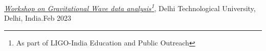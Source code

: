\begin{itemize}[noitemsep]
{
\item \href{https://github.com/singhmukesh1729/EPO_DTU2023}{\textit{Workshop on Gravitational Wave data analysis\footnote{As part of LIGO-India Education and Public Outreach}}}, Delhi Technological University, Delhi, India.\hfill{Feb 2023}
}\end{itemize}
